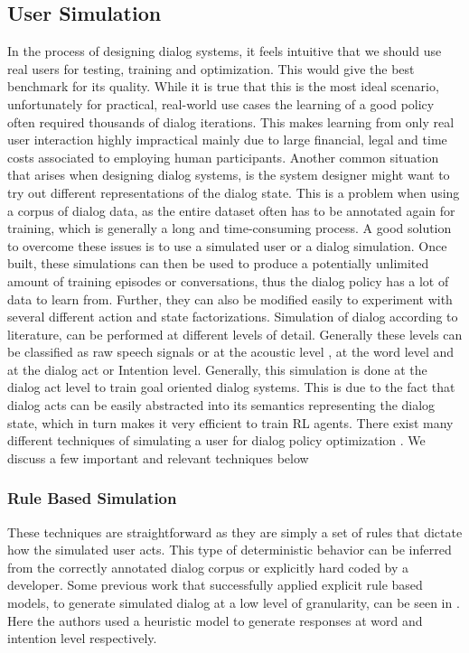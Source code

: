 \documentclass[14pt]{extarticle}
\numberwithin{equation}{section}
\begin{document}
	\subsection{User Simulation}
	In the process of designing dialog systems, it feels intuitive that we should use real users for testing, training and optimization. This would give the best benchmark for its quality. While it is true that this is the most ideal scenario, unfortunately for practical, real-world use cases the learning of a good policy often required thousands of dialog iterations. This makes learning from only real user interaction highly impractical mainly due to large financial, legal and time costs associated to employing human participants. Another common situation that arises when designing dialog systems, is the system designer might want to try out different representations of the dialog state. This is a problem when using a corpus of dialog data, as the entire dataset often has to be annotated again for training, which is generally a long and time-consuming process. A good solution to overcome these issues is to use a simulated user or a dialog simulation. Once built, these simulations can then be used to produce a potentially unlimited amount of training episodes or conversations, thus the dialog policy has a lot of data to learn from. Further, they can also be modified easily to experiment with several different action and state factorizations.
	Simulation of dialog according to literature, can be performed at different levels of detail. Generally these levels can be classified as raw speech signals or at the acoustic level \cite{lopez-cozar-simulation}, at the word level and at the dialog act or Intention level. Generally, this simulation is done at the dialog act level to train goal oriented dialog systems. This is due to the fact that dialog acts can be easily abstracted into its semantics representing the dialog state, which in turn makes it very efficient to train RL agents.
	There exist many different techniques of simulating a user for dialog policy optimization \cite{Schatzmann_stat_user_sim}. We discuss a few important and relevant techniques below
	\subsubsection{Rule Based Simulation}	
	These techniques are straightforward as they are simply a set of rules that dictate how the simulated user acts. This type of deterministic behavior can be inferred from the correctly annotated dialog corpus or explicitly hard coded by a developer. Some previous work that successfully applied explicit rule based models, to generate simulated dialog at a low level of granularity, can be seen in  \cite{Chung_user_sim}\cite{Lopez-Cozar_user-sim}. Here the authors used a heuristic model to generate responses at word and intention level respectively.
\end{document}
